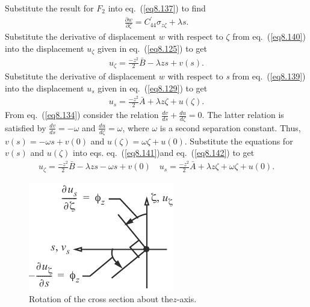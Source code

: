 \documentclass{AeroStructure-ERJohnson}
\begin{document}
Substitute the result for $F_2$ into eq.~(\ref{eq8.137}) to
find
\begin{align}\label{eq8.140}
\frac{\partial w}{\partial \zeta}=C_{44}^{\prime} \sigma_{z
\zeta}+\lambda s.
\end{align}
Substitute the derivative of displacement $w$ with respect to $\zeta$
from eq.~(\ref{eq8.140}) into the displacement $u_{\zeta}$ given
in eq.~(\ref{eq8.125}) to get
\begin{align}\label{eq8.141}
u_{\zeta}=\frac{-z^{2}}{2} \bar{B}-\lambda z s+v(s).
\end{align}
Substitute the derivative of displacement $w$ with respect to
\textit{s} from eq.~(\ref{eq8.139}) into the displacement $u_{s}$
given in eq.~(\ref{eq8.129}) to get
\begin{align}\label{eq8.142}
u_{s}=\frac{-z^{2}}{2} \bar{A}+\lambda z \zeta+u(\zeta).
\end{align}
From eq.~(\ref{eq8.134}) consider the relation $\frac{d v}{d
s}+\frac{d u}{d \zeta}=0$. The latter relation is satisfied by
$\frac{d v}{d s}=-\omega$ and $\frac{d u}{d \zeta}=\omega$, where
$\omega$ is a second separation constant. Thus, $v(s)=-\omega
s+v(0)$ and $u(\zeta)=\omega \zeta+u(0)$. Substitute the equations
for $v(s)$ and $u(\zeta)$ into eqs. eq.~(\ref{eq8.141})and
eq.~(\ref{eq8.142}) to get
\begin{align}\label{eq8.143}
u_{\zeta}=\frac{-z^{2}}{2} \bar{B}-\lambda z s-\omega s+v(0) \quad
u_{s}=\frac{-z^{2}}{2} \bar{A}+\lambda z \zeta+\omega \zeta+u(0).
\end{align}

\begin{figure}
\vspace{-24pt}
\includegraphics{Figure_8-12.pdf}
\caption{Rotation of the cross section about the\break $z$-axis.\label{fig8.12}}
\end{figure}
\end{document}
